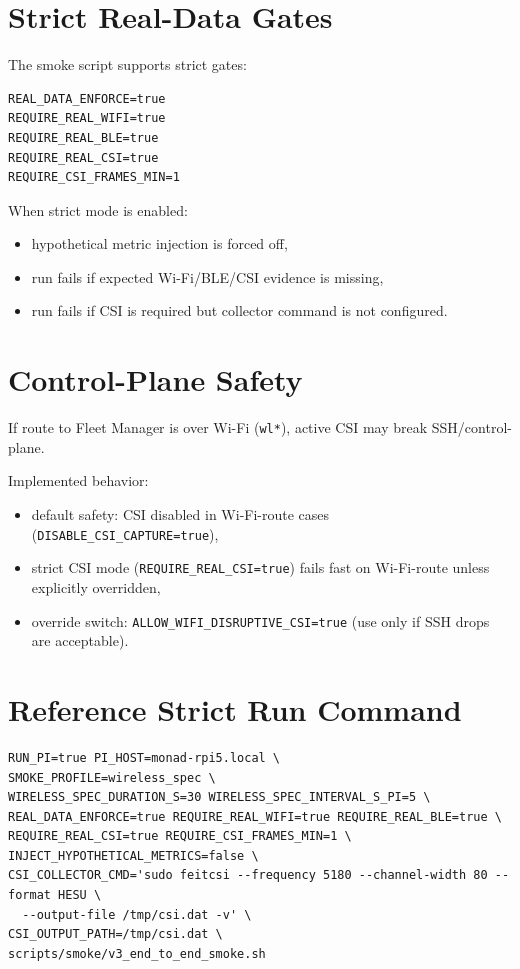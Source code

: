 \documentclass[11pt,a4paper]{article}
\begin{document}
\section{Strict Real-Data Gates}
The smoke script supports strict gates:
\begin{verbatim}
REAL_DATA_ENFORCE=true
REQUIRE_REAL_WIFI=true
REQUIRE_REAL_BLE=true
REQUIRE_REAL_CSI=true
REQUIRE_CSI_FRAMES_MIN=1
\end{verbatim}

When strict mode is enabled:
\begin{itemize}
  \item hypothetical metric injection is forced off,
  \item run fails if expected Wi-Fi/BLE/CSI evidence is missing,
  \item run fails if CSI is required but collector command is not configured.
\end{itemize}

\section{Control-Plane Safety}
If route to Fleet Manager is over Wi-Fi (\texttt{wl*}), active CSI may break SSH/control-plane.

Implemented behavior:
\begin{itemize}
  \item default safety: CSI disabled in Wi-Fi-route cases (\texttt{DISABLE\_CSI\_CAPTURE=true}),
  \item strict CSI mode (\texttt{REQUIRE\_REAL\_CSI=true}) fails fast on Wi-Fi-route unless explicitly overridden,
  \item override switch: \texttt{ALLOW\_WIFI\_DISRUPTIVE\_CSI=true} (use only if SSH drops are acceptable).
\end{itemize}

\section{Reference Strict Run Command}
\begin{verbatim}
RUN_PI=true PI_HOST=monad-rpi5.local \
SMOKE_PROFILE=wireless_spec \
WIRELESS_SPEC_DURATION_S=30 WIRELESS_SPEC_INTERVAL_S_PI=5 \
REAL_DATA_ENFORCE=true REQUIRE_REAL_WIFI=true REQUIRE_REAL_BLE=true \
REQUIRE_REAL_CSI=true REQUIRE_CSI_FRAMES_MIN=1 \
INJECT_HYPOTHETICAL_METRICS=false \
CSI_COLLECTOR_CMD='sudo feitcsi --frequency 5180 --channel-width 80 --format HESU \
  --output-file /tmp/csi.dat -v' \
CSI_OUTPUT_PATH=/tmp/csi.dat \
scripts/smoke/v3_end_to_end_smoke.sh
\end{verbatim}
\end{document}
